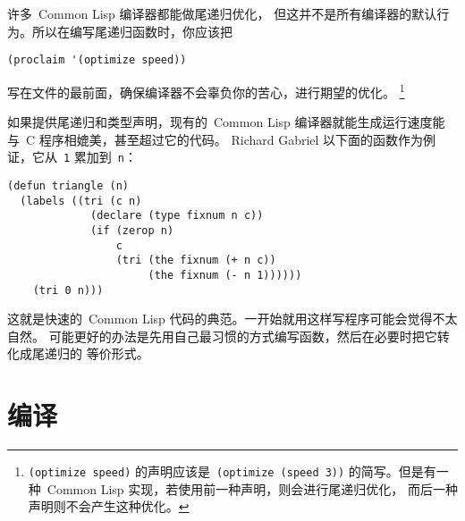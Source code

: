 许多~Common Lisp 编译器都能做尾递归优化，
但这并不是所有编译器的默认行为。所以在编写尾递归函数时，你应该把
\begin{lstlisting}
(proclaim '(optimize speed))
\end{lstlisting}
写在文件的最前面，确保编译器不会辜负你的苦心，进行期望的优化。
\footnote{\texttt{(optimize speed)} 的声明应该是~\texttt{(optimize (speed 3))}
  的简写。但是有一种~Common Lisp 实现，若使用前一种声明，则会进行尾递归优化，
  而后一种声明则不会产生这种优化。}

如果提供尾递归和类型声明，现有的~Common
Lisp 编译器就能生成运行速度能与~C 程序相媲美，甚至超过它的代码。
Richard Gabriel
以下面的函数作为例证，它从~\texttt{1} 累加到~\texttt{n}：
\begin{lstlisting}
(defun triangle (n)
  (labels ((tri (c n)
             (declare (type fixnum n c))
             (if (zerop n)
                 c
                 (tri (the fixnum (+ n c))
                      (the fixnum (- n 1))))))
    (tri 0 n)))
\end{lstlisting}
这就是快速的~Common Lisp 代码的典范。一开始就用这样写程序可能会觉得不太自然。
可能更好的办法是先用自己最习惯的方式编写函数，然后在必要时把它转化成尾递归的
等价形式。

\section{编译}
\label{sec:compilation}


